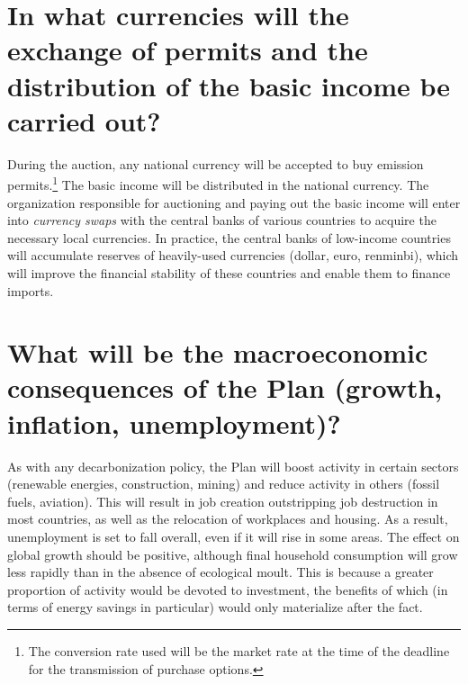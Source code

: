 \documentclass[a5paper,english,openany]{memoir}
\begin{document}
\section*{\normalsize In what currencies will the exchange of permits and the distribution of the basic income be carried out?\label{q:devise}}

During the auction, any national currency will be accepted to buy emission permits.\footnote{The conversion rate used will be the market rate at the time of the deadline for the transmission of purchase options.} The basic income will be distributed in the national currency. The organization responsible for auctioning and paying out the basic income will enter into \textit{currency swaps} with the central banks of various countries to acquire the necessary local currencies. In practice, the central banks of low-income countries will accumulate reserves of heavily-used currencies (dollar, euro, renminbi), which will improve the financial stability of these countries and enable them to finance imports.

\section*{\normalsize What will be the macroeconomic consequences of the Plan (growth, inflation, unemployment)?}\label{q:macro}

As with any decarbonization policy, the Plan will boost activity in certain sectors (renewable energies, construction, mining) and reduce activity in others (fossil fuels, aviation). This will result in job creation outstripping job destruction in most countries, as well as the relocation of workplaces and housing. As a result, unemployment is set to fall overall, even if it will rise in some areas. The effect on global growth should be positive, although final household consumption will grow less rapidly than in the absence of ecological moult. This is because a greater proportion of activity would be devoted to investment, the benefits of which (in terms of energy savings in particular) would only materialize after the fact. 
\end{document}
